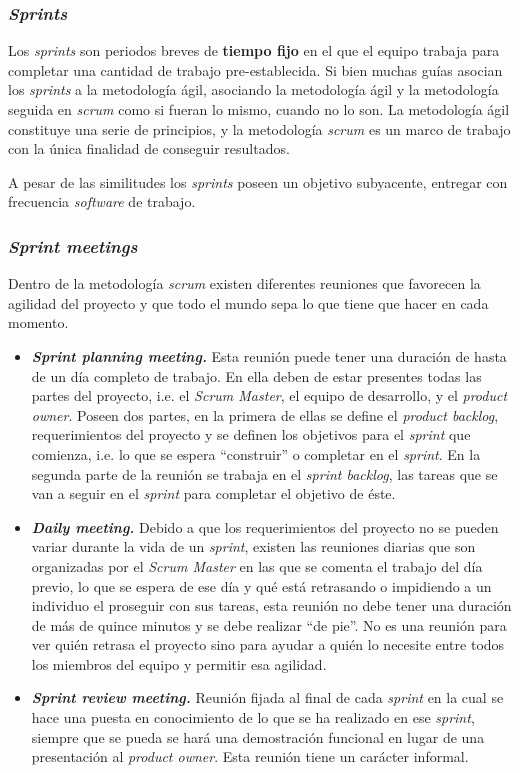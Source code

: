 \subsubsection{\textit{Sprints}}
Los \textit{sprints} son periodos breves de \textbf{tiempo fijo} en el que el equipo trabaja para completar una cantidad de trabajo pre-establecida. Si bien muchas guías asocian los \textit{sprints} a la metodología ágil, asociando la metodología ágil y la metodología seguida en \textit{scrum} como si fueran lo mismo, cuando no lo son. La metodología ágil constituye una serie de principios, y la metodología \textit{scrum} es un marco de trabajo con la única finalidad de conseguir resultados.

A pesar de las similitudes los \textit{sprints} poseen un objetivo subyacente, entregar con frecuencia \textit{software} de trabajo.

\subsubsection{\textit{Sprint meetings}}
Dentro de la metodología \textit{scrum} existen diferentes reuniones que favorecen la agilidad del proyecto y que todo el mundo sepa lo que tiene que hacer en cada momento.
\begin{itemize}
\item \textbf{\textit{Sprint planning meeting.}} Esta reunión puede tener una duración de hasta de un día completo de trabajo. En ella deben de estar presentes todas las partes del proyecto, i.e. el \textit{Scrum Master}, el equipo de desarrollo, y el \textit{product owner}. Poseen dos partes, en la primera de ellas se define el \textit{product backlog}, requerimientos del proyecto y se definen los objetivos para el \textit{sprint} que comienza, i.e. lo que se espera ``construir'' o completar en el \textit{sprint}. En la segunda parte de la reunión se trabaja en el \textit{sprint backlog}, las tareas que se van a seguir en el \textit{sprint} para completar el objetivo de éste.
\item \textbf{\textit{Daily meeting.}} Debido a que los requerimientos del proyecto no se pueden variar durante la vida de un \textit{sprint}, existen las reuniones diarias que son organizadas por el \textit{Scrum Master} en las que se comenta el trabajo del día previo, lo que se espera de ese día y qué está retrasando o impidiendo a un individuo el proseguir con sus tareas, esta reunión no debe tener una duración de más de quince minutos y se debe realizar ``de pie''. No es una reunión para ver quién retrasa el proyecto sino para ayudar a quién lo necesite entre todos los miembros del equipo y permitir esa agilidad.
\item \textbf{\textit{Sprint review meeting.}} Reunión fijada al final de cada \textit{sprint} en la cual se hace una puesta en conocimiento de lo que se ha realizado en ese \textit{sprint}, siempre que se pueda se hará una demostración funcional en lugar de una presentación al \textit{product owner}. Esta reunión tiene un carácter informal.
\end{itemize}
 
